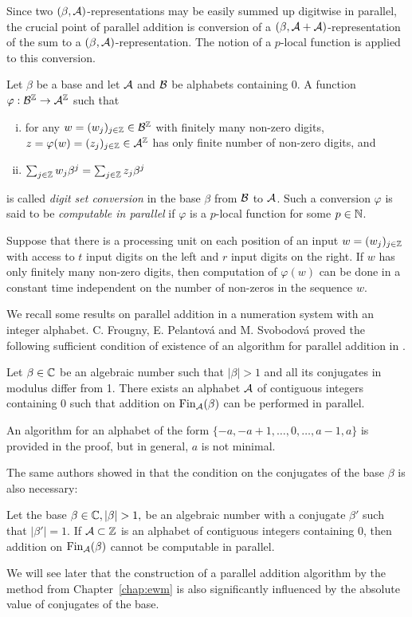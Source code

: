   
Since two $(\beta,\mathcal{A})$-representations may be easily summed up digitwise in parallel, the crucial point of parallel addition is conversion of a $(\beta,\mathcal{A}+\mathcal{A})$-representation of the sum to a $(\beta,\mathcal{A})$-representation. The notion of a $p$-local function is applied to this conversion.
\begin{defn}
\label{def:digitSetConversion}
Let $\beta$ be a base and let $\mathcal{A}$ and $\mathcal{B}$ be alphabets containing 0. A function $\varphi:\mathcal{B}^{\mathbb{Z}}\rightarrow \mathcal{A}^{\mathbb{Z}}$ such that
  \begin{enumerate}[i)]
      \item for any $w=(w_j)_{j\in\mathbb{Z}}\in\mathcal{B}^{\mathbb{Z}}$ with finitely many non-zero digits, $z=\varphi(w)=(z_j)_{j\in\mathbb{Z}}\in\mathcal{A}^{\mathbb{Z}}$ has only finite number of non-zero digits, and
      \item $\sum_{j\in\mathbb{Z}} w_j \beta^j= \sum_{j\in\mathbb{Z}} z_j \beta^j$
  \end{enumerate}
  is called \emph{digit set conversion} in the base $\beta$ from $\mathcal{B}$ to $\mathcal{A}$. Such a conversion $\varphi$ is said to be \emph{computable in parallel} if $\varphi$ is a $p$-local function for some $p\in\mathbb{N}$. 
\end{defn}

Suppose that there is a processing unit on  each position of an input $w=(w_j)_{j\in\mathbb{Z}}$ with access to $t$ input digits on the left and $r$ input digits on the right. If $w$ has only finitely many non-zero digits, then computation of $\varphi(w)$ can be done in a constant time independent on the number of non-zeros in the sequence $w$.

We recall some results on parallel addition in a numeration system with an integer alphabet. C. Frougny, E. Pelantov\'a and M. Svobodov\'a proved  the following sufficient condition of existence of an algorithm for parallel addition in \cite{parAddNS}.
  \begin{thm}
  \label{thm:suffConjugates}
  Let $\beta\in\mathbb{C}$ be an algebraic number such that $|\beta|>1$ and all its conjugates in modulus differ from 1. There exists an alphabet $\mathcal{A}$ of contiguous integers containing 0 such that addition on $\text{Fin}_{\mathcal{A}}(\beta)$ can be performed in parallel.
  \end{thm}
An algorithm for an alphabet of the form $\{-a,-a+1, \dots,0,\dots,a-1,a\}$ is provided in the proof, but in general, $a$ is not minimal.
    
The same authors showed in \cite{kBlock} that the condition on the conjugates of the base $\beta$ is also necessary:
  \begin{thm}
  Let the base $\beta\in\CC, |\beta|>1,$ be an algebraic number with a conjugate $\beta'$ such that $|\beta'|=1$. If  $\mathcal{A}\subset\mathbb{Z}$ is an alphabet of contiguous integers containing 0, then addition on $\text{Fin}_{\mathcal{A}}(\beta)$ cannot be computable in parallel.
  \end{thm}
We will see later that the construction of a parallel addition algorithm by the method from Chapter~\ref{chap:ewm} is also significantly influenced by the absolute value of conjugates of the base.
  
